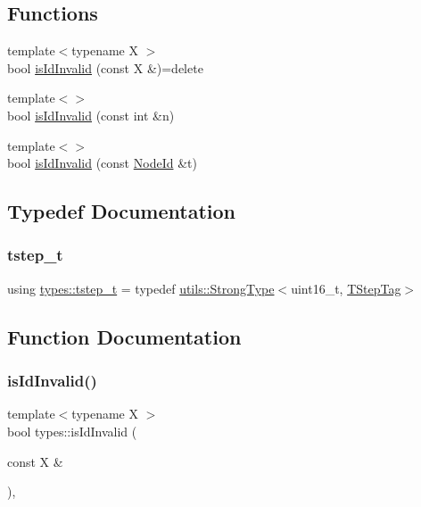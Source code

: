 \subsection*{Functions}
\begin{DoxyCompactItemize}
\item 
{\footnotesize template$<$typename X $>$ }\\bool \mbox{\hyperlink{namespacetypes_a74cc86ac80d5a97da7e0d52e8f78fc36}{is\+Id\+Invalid}} (const X \&)=delete
\item 
{\footnotesize template$<$$>$ }\\bool \mbox{\hyperlink{namespacetypes_a7569877e4e19c123226e40bb457017ae}{is\+Id\+Invalid}} (const int \&n)
\item 
{\footnotesize template$<$$>$ }\\bool \mbox{\hyperlink{namespacetypes_a7cc0bd2ca14acbdebad622de847a2cb8}{is\+Id\+Invalid}} (const \mbox{\hyperlink{classtypes_1_1_node_id}{Node\+Id}} \&t)
\end{DoxyCompactItemize}


\subsection{Typedef Documentation}
\mbox{\label{namespacetypes_a9dc53a5ce11a196d82a6983030de8028}} 
\subsubsection{\texorpdfstring{tstep\_t}{tstep\_t}}
{\footnotesize\ttfamily using \mbox{\hyperlink{namespacetypes_a9dc53a5ce11a196d82a6983030de8028}{types\+::tstep\+\_\+t}} = typedef \mbox{\hyperlink{classutils_1_1_strong_type}{utils\+::\+Strong\+Type}}$<$uint16\+\_\+t, \mbox{\hyperlink{structtypes_1_1_t_step_tag}{T\+Step\+Tag}}$>$}



\subsection{Function Documentation}
\mbox{\label{namespacetypes_a74cc86ac80d5a97da7e0d52e8f78fc36}} 
\subsubsection{\texorpdfstring{isIdInvalid()}{isIdInvalid()}\hspace{0.1cm}{\footnotesize\ttfamily [1/3]}}
{\footnotesize\ttfamily template$<$typename X $>$ \\
bool types\+::is\+Id\+Invalid (\begin{DoxyParamCaption}\item[{const X \&}]{ }\end{DoxyParamCaption})\hspace{0.3cm}{\ttfamily [inline]}, {\ttfamily [delete]}}

